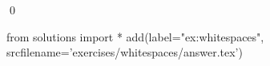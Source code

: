 
\begin{ex} 
  \label{ex:whitespaces}
  
  \qed
\end{ex} 
\begin{python0}
from solutions import *
add(label="ex:whitespaces",
    srcfilename='exercises/whitespaces/answer.tex') 
\end{python0}
